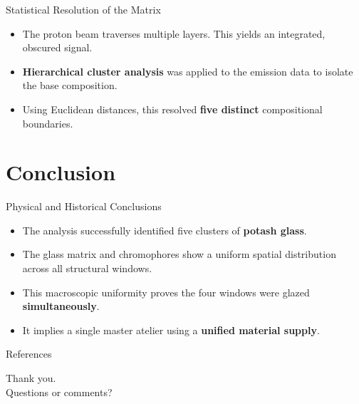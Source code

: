 \documentclass[aspectratio=169]{beamer}
\begin{document}
\begin{frame}{Statistical Resolution of the Matrix}
  \begin{itemize}
    \item The proton beam traverses multiple layers. This yields an integrated,
      obscured signal.
    \item \textbf{Hierarchical cluster analysis} was applied to the emission
      data to isolate the base composition.
    \item Using Euclidean distances, this resolved \textbf{five distinct}
      compositional boundaries.
  \end{itemize}
\end{frame}

\section{Conclusion}

\begin{frame}{Physical and Historical Conclusions}
  \begin{itemize}
    \item The analysis successfully identified five clusters of \textbf{potash
      glass}.
    \item The glass matrix and chromophores show a uniform spatial distribution
      across all structural windows.
    \item This macroscopic uniformity proves the four windows were glazed
      \textbf{simultaneously}.
    \item It implies a single master atelier using a \textbf{unified material
      supply}.
  \end{itemize}
\end{frame}

\begin{frame}[allowframebreaks]{References}
  \printbibliography
  \nocite{*}
\end{frame}

\begin{frame}[plain]
  \centering
  \vspace{1cm}
  {\Huge Thank you.}\\[1cm]
  {\large Questions or comments?}
\end{frame}
\end{document}
